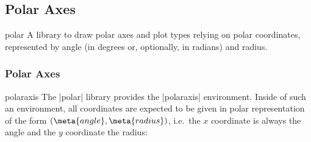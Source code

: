 \subsection{Polar Axes}
{
%

\begin{pgfplotslibrary}{polar}
	A library to draw polar axes and plot types relying on polar coordinates, represented by angle (in degrees or, optionally, in radians) and radius.
\end{pgfplotslibrary}

\subsubsection{Polar Axes}
\begin{environment}{{polaraxis}}
	The |polar| library provides the |polaraxis| environment.
	 Inside of such an environment, all coordinates are expected to be given in polar representation of the form $(\meta{angle},\meta{radius})$, i.e.\ the $x$ coordinate is always the angle and the $y$ coordinate the radius:
\end{environment}
\begin{codeexample}[]
\end{codeexample}

\begin{codeexample}[]
\end{codeexample}

\begin{codeexample}[]
\end{codeexample}

}
